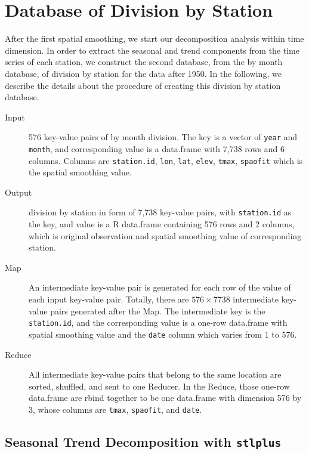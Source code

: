 \section{Database of Division by Station}
\label{sec:a1950.divibyStation}

After the first spatial smoothing, we start our decomposition analysis within
time dimension. In order to extract the seasonal and trend components from the
time series of each station, we construct the second database, from the by month 
database, of division by station for the data after 1950. In the following, we 
describe the details about the procedure of creating this division by station 
database.

\begin{description}
  \item[Input] 576 key-value pairs of by month division. The key is a vector
  of \texttt{year} and \texttt{month}, and corresponding value is a data.frame
  with 7,738 rows and 6 columns. Columns are \texttt{station.id}, \texttt{lon},
  \texttt{lat}, \texttt{elev}, \texttt{tmax}, \texttt{spaofit} which is the
  spatial smoothing value. 
  \item[Output] division by station in form of 7,738 key-value pairs, with 
  \texttt{station.id} as the key, and value is a R data.frame containing 576 rows 
  and 2 columns, which is original observation and spatial smoothing value of 
  corresponding station.
  \item[Map]An intermediate key-value pair is generated for each row of the value 
  of each input key-value pair. Totally, there are $576 \times 7738$ intermediate 
  key-value pairs generated after the Map. The intermediate key is the 
  \texttt{station.id}, and the corresponding value is a one-row data.frame with 
  spatial smoothing value and the \texttt{date} column which varies from 1 to 576.
  \item[Reduce] All intermediate key-value pairs that belong to the same location 
  are sorted, shuffled, and sent to one Reducer. In the Reduce, those one-row
  data.frame are rbind together to be one data.frame with dimension 576 by 3, 
  whose columns are \texttt{tmax}, \texttt{spaofit}, and \texttt{date}.
\end{description}


\subsection{Seasonal Trend Decomposition with \texttt{stlplus}}
\label{sec:a1950.stl}

